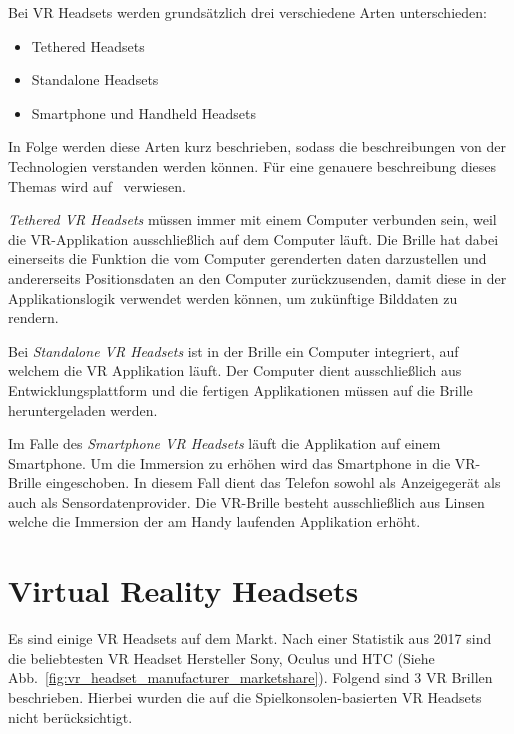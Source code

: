 Bei VR Headsets werden grundsätzlich drei verschiedene Arten unterschieden:

\begin{itemize}
    \item Tethered Headsets
    \item Standalone Headsets
    \item Smartphone und Handheld Headsets
\end{itemize}

In Folge werden diese Arten kurz beschrieben, sodass die beschreibungen von der Technologien verstanden werden können.
Für eine genauere beschreibung dieses Themas wird auf~\cite{ANIWAA_TEAM_2021} verwiesen.

\emph{Tethered VR Headsets} müssen immer mit einem Computer verbunden sein, weil die VR-Applikation ausschließlich auf dem Computer läuft.
Die Brille hat dabei einerseits die Funktion die vom Computer gerenderten daten darzustellen und andererseits Positionsdaten an den Computer zurückzusenden, damit diese in der Applikationslogik verwendet werden können, um zukünftige Bilddaten zu rendern.

Bei \emph{Standalone VR Headsets} ist in der Brille ein Computer integriert, auf welchem die VR Applikation läuft.
Der Computer dient ausschließlich aus Entwicklungsplattform und die fertigen Applikationen müssen auf die Brille heruntergeladen werden.

Im Falle des \emph{Smartphone VR Headsets} läuft die Applikation auf einem Smartphone.
Um die Immersion zu erhöhen wird das Smartphone in die VR-Brille eingeschoben.
In diesem Fall dient das Telefon sowohl als Anzeigegerät als auch als Sensordatenprovider.
Die VR-Brille besteht ausschließlich aus Linsen welche die Immersion der am Handy laufenden Applikation erhöht.

\section{Virtual Reality Headsets}
\label{sec:virtual-reality-headsets}

Es sind einige VR Headsets auf dem Markt.
Nach einer Statistik aus 2017 sind die beliebtesten VR Headset Hersteller Sony, Oculus und HTC (Siehe Abb.~\ref{fig:vr_headset_manufacturer_marketshare}).
Folgend sind 3 VR Brillen beschrieben.
Hierbei wurden die auf die Spielkonsolen-basierten VR Headsets nicht berücksichtigt.

